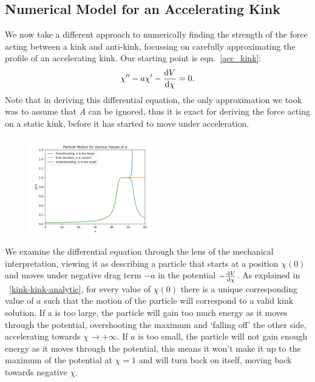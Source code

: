 \documentclass[11pt, oneside]{article}  	%
\numberwithin{equation}{section}
\newcommand{\drv}{\ensuremath{\textup{d}}}
\begin{document}
\subsection{Numerical Model for an Accelerating Kink}
We now take a different approach to numerically finding the strength of the force acting between a kink and anti-kink, focussing on carefully approximating the profile of an accelerating kink. Our starting point is eqn.~\ref{acc_kink}:
 \begin{equation}
 \chi'' - a\chi' - \frac{\drv V }{\drv \chi}=0.
 \end{equation}
 Note that in deriving this differential equation, the only approximation we took was to assume that $\dot{A}$ can be ignored, thus it is exact for deriving the force acting on a static kink, before it has started to move under acceleration.\par
   \begin{figure}
 \vspace{-10pt}
\centering
 \includegraphics[width=0.5\textwidth]{over_under.png}
  \label{over_under}
\end{figure} 
 We examine the differential equation through the lens of the mechanical interpretation, viewing it as describing a particle that starts at a position $\chi(0)$ and moves under negative drag term $-a$ in the potential $- \frac{\drv V }{\drv \chi}$. As explained in \textsection~\ref{kink-kink-analytic}, for every value of $\chi(0)$ there is a unique corresponding value of $a$ such that the motion of the particle will correspond to a valid kink solution. If a is too large, the particle will gain too much energy as it moves through the potential, overshooting the maximum and `falling off' the other side, accelerating towards $\chi \rightarrow +\infty$. If $a$ is too small, the particle will not gain enough energy as it moves through the potential, this means it won't make it up to the maximum of the potential at  $\chi=1$ and will turn back on itself, moving back towards negative $\chi$.\par
\end{document}

